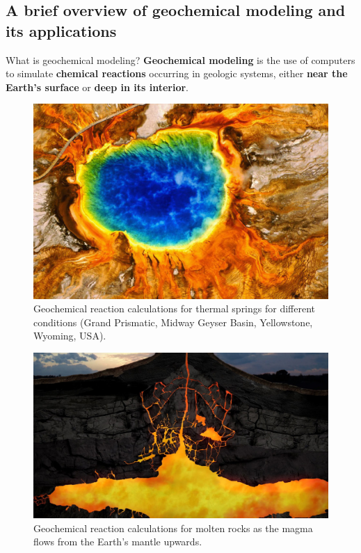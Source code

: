 \subsection{A brief overview of geochemical modeling and its applications}
\begin{frame}{What is geochemical modeling?}
\vskip 10pt
 \textbf{Geochemical modeling} is the use of computers to simulate \textbf{chemical
reactions} occurring in geologic systems, either \textbf{near the
Earth's surface} or \textbf{deep in its interior}.
%
\lcol
\begin{singlespace}
%
\begin{figure}
\centering
\vskip 10pt
\includegraphics[height=0.5\columnwidth]{figures/applications/example-of-geochemical-reactions-in-yellowstone-geysers}
\caption*{Geochemical reaction calculations for thermal springs for different conditions        
(Grand Prismatic, Midway Geyser Basin, Yellowstone, Wyoming, USA).}
\end{figure}
%
\end{singlespace}
%
\rcol
\begin{figure}
\vskip 5pt
\centering
\includegraphics[height=0.5\columnwidth]{figures/applications/example-of-geochemical-reactions-in-a-volcano-magma-chamber}
\caption*{Geochemical reaction calculations for molten rocks as the magma flows
from the Earth's mantle upwards.}
\end{figure}
\ecol
\end{frame}

